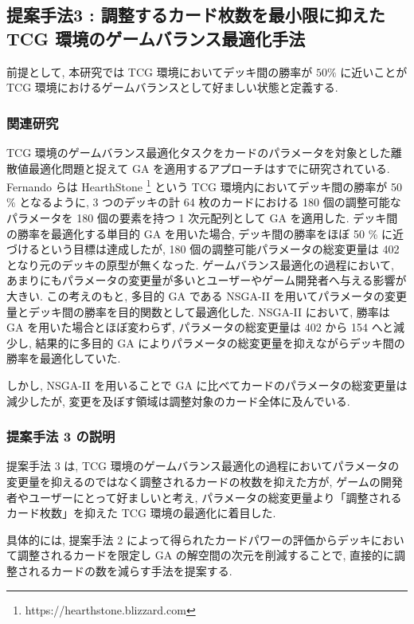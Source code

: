 \documentclass[12pt]{jarticle}
\begin{document}
\subsection{提案手法3 : 調整するカード枚数を最小限に抑えた TCG 環境のゲームバランス最適化手法}
前提として, 本研究では TCG 環境においてデッキ間の勝率が $50\%$ に近いことが TCG 環境におけるゲームバランスとして好ましい状態と定義する.

\subsubsection{関連研究}
\label{hearthstone}
TCG 環境のゲームバランス最適化タスクをカードのパラメータを対象とした離散値最適化問題と捉えて GA を適用するアプローチはすでに研究されている.
Fernando らは HearthStone \footnote[1]{https://hearthstone.blizzard.com} という TCG 環境内においてデッキ間の勝率が 50 \% となるように, 3 つのデッキの計 64 枚のカードにおける 180 個の調整可能なパラメータを 180 個の要素を持つ 1 次元配列として GA を適用した\cite{EvolvingHearthStone}.
デッキ間の勝率を最適化する単目的 GA を用いた場合, デッキ間の勝率をほぼ 50 \% に近づけるという目標は達成したが, 180 個の調整可能パラメータの総変更量は 402 となり元のデッキの原型が無くなった. 
ゲームバランス最適化の過程において, あまりにもパラメータの変更量が多いとユーザーやゲーム開発者へ与える影響が大きい. この考えのもと, 多目的 GA である NSGA-II を用いてパラメータの変更量とデッキ間の勝率を目的関数として最適化した.
NSGA-II において, 勝率は GA を用いた場合とほぼ変わらず, パラメータの総変更量は 402 から 154 へと減少し, 結果的に多目的 GA によりパラメータの総変更量を抑えながらデッキ間の勝率を最適化していた.
\par
しかし, NSGA-II を用いることで GA に比べてカードのパラメータの総変更量は減少したが, 変更を及ぼす領域は調整対象のカード全体に及んでいる.  


\subsubsection{提案手法 3 の説明}
提案手法 3 は, TCG 環境のゲームバランス最適化の過程においてパラメータの変更量を抑えるのではなく調整されるカードの枚数を抑えた方が, ゲームの開発者やユーザーにとって好ましいと考え, パラメータの総変更量より「調整されるカード枚数」を抑えた TCG 環境の最適化に着目した.\par
具体的には, 提案手法 2 によって得られたカードパワーの評価からデッキにおいて調整されるカードを限定し GA の解空間の次元を削減することで, 直接的に調整されるカードの数を減らす手法を提案する.
\end{document}
